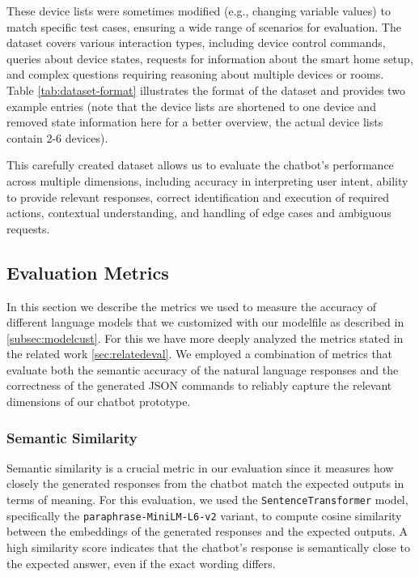 These device lists were sometimes modified (e.g., changing variable values) to match specific test cases, ensuring a wide range of scenarios for evaluation.
The dataset covers various interaction types, including device control commands, queries about device states, requests for information about the smart home setup, and complex questions requiring reasoning about multiple devices or rooms.
Table \ref{tab:dataset-format} illustrates the format of the dataset and provides two example entries (note that the device lists are shortened to one device and removed state information here for a better overview, the actual device lists contain 2-6 devices).

This carefully created dataset allows us to evaluate the chatbot's performance across multiple dimensions, including accuracy in interpreting user intent, ability to provide relevant responses, correct identification and execution of required actions, contextual understanding, and handling of edge cases and ambiguous requests.


\subsection{Evaluation Metrics}
In this section we describe the metrics we used to measure the accuracy of different language models that we customized with our modelfile as described in \cref{subsec:modelcust}.
For this we have more deeply analyzed the metrics stated in the related work \cref{sec:relatedeval}.
We employed a combination of metrics that evaluate both the semantic accuracy of the natural language responses and the correctness of the generated JSON commands to reliably capture the relevant dimensions of our chatbot prototype.

\subsubsection{Semantic Similarity}

Semantic similarity is a crucial metric in our evaluation since it measures how closely the generated responses from the chatbot match the expected outputs in terms of meaning. For this evaluation, we used the \texttt{SentenceTransformer} model, specifically the \texttt{paraphrase-MiniLM-L6-v2} variant, to compute cosine similarity between the embeddings of the generated responses and the expected outputs. A high similarity score indicates that the chatbot's response is semantically close to the expected answer, even if the exact wording differs.

